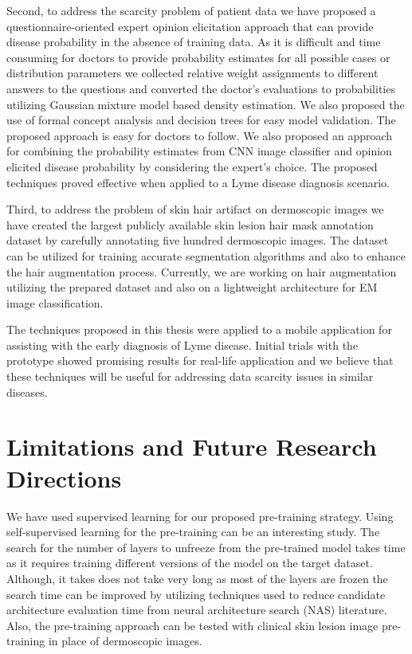 Second, to address the scarcity problem of patient data we have proposed a questionnaire-oriented expert opinion elicitation approach that can provide disease probability in the absence of training data. As it is difficult and time consuming for doctors to provide probability estimates for all possible cases or distribution parameters we collected relative weight assignments to different answers to the questions and converted the doctor’s evaluations to probabilities utilizing Gaussian mixture model based density estimation. We also proposed the use of formal concept analysis and decision trees for easy model validation.  The proposed approach is easy for doctors to follow. We also proposed an approach for combining the probability estimates from CNN image classifier and opinion elicited disease probability by considering the expert’s choice. The proposed techniques proved effective when applied to a Lyme disease diagnosis scenario.

Third, to address the problem of skin hair artifact on dermoscopic images we have created the largest publicly available skin lesion hair mask annotation dataset by carefully annotating five hundred dermoscopic images. The dataset can be utilized for training accurate segmentation algorithms and also to enhance the hair augmentation process. Currently, we are working on hair augmentation utilizing the prepared dataset and also on a lightweight architecture for EM image classification.

The techniques proposed in this thesis were applied to a mobile application for assisting with the early diagnosis of Lyme disease. Initial trials with the prototype showed promising results for real-life application and we believe that these techniques will be useful for addressing data scarcity issues in similar diseases. 

\section{Limitations and Future Research Directions}
We have used supervised learning for our proposed pre-training strategy. Using self-supervised learning for the pre-training can be an interesting study. The search for the number of layers to unfreeze from the pre-trained model takes time as it requires training different versions of the model on the target dataset. Although, it takes does not take very long as most of the layers are frozen the search time can be improved by utilizing techniques used to reduce candidate architecture evaluation time from neural architecture search (NAS) literature\cite{NASefficiency}. Also, the pre-training approach can be tested with clinical skin lesion image pre-training in place of dermoscopic images. 

